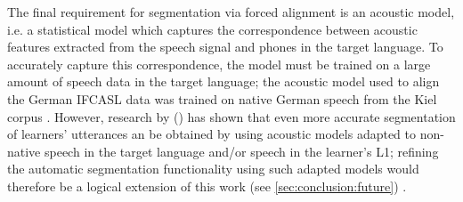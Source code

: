 	The final requirement for segmentation via forced alignment is an acoustic model, i.e. a statistical model 
	which captures the correspondence between acoustic features extracted from the speech signal and phones in the target language. 
	To accurately capture this correspondence, the model must be trained on a large amount of speech data in the target language; 
	the acoustic model used to align the German IFCASL data was trained on native German speech from the Kiel corpus .
	However, research by \citeauthor{Bouselmi2005} (\citeyear{Bouselmi2005,Bouselmi2012}) has shown that even more accurate segmentation of learners' utterances an be obtained by using acoustic models adapted to non-native speech in the target language and/or speech in the learner's L1; refining the automatic segmentation functionality using such adapted models would therefore be a logical extension of this work (see \cref{sec:conclusion:future}) .
	
	
	
	
	
